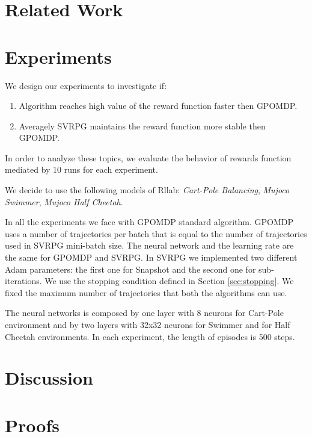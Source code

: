 \documentclass{article}
\theoremstyle{remark}
\theoremstyle{definition}
\begin{document}
\section{Related Work}

\section{Experiments}
We design our experiments to investigate if:
\begin{enumerate}
\item Algorithm reaches high value of the reward function faster then GPOMDP.
\item Averagely SVRPG maintains the reward function more stable then GPOMDP.
\end{enumerate}

In order to analyze these topics, we evaluate the behavior of rewards function mediated by 10 runs for each experiment.

We decide to use the following models of Rllab: \emph{Cart-Pole Balancing}, \emph{Mujoco Swimmer}, \emph{Mujoco Half Cheetah}.


In all the experiments we face with GPOMDP standard algorithm. GPOMDP uses a number of trajectories per batch that is equal to the number of trajectories used in SVRPG mini-batch size.
The neural network and the learning rate are the same for GPOMDP and SVRPG.
In SVRPG we implemented two different Adam parameters: the first one for Snapshot and the second one for sub-iterations.
We use the stopping condition defined in Section \ref{sec:stopping}.
We fixed the maximum number of trajectories that both the algorithms can use. 

The neural networks is composed by one layer with 8 neurons for Cart-Pole environment and by two layers with 32x32 neurons for Swimmer and for Half Cheetah environments. In each experiment, the length of episodes is 500 steps.

\section{Discussion}




\newpage
\mbox{}
\newpage
\onecolumn
\appendix

\section{Proofs}\label{app:proofs}
\end{document}
